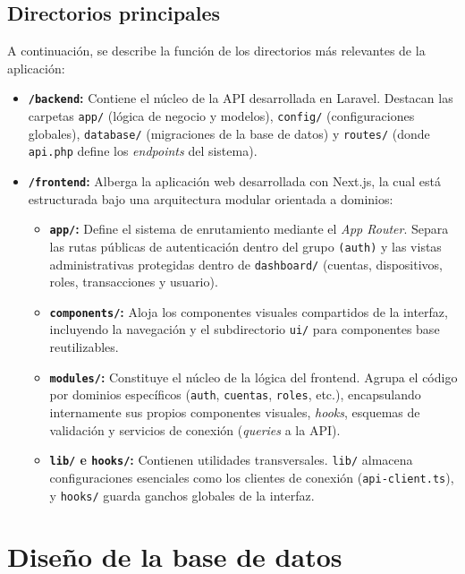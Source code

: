 \documentclass[12pt,letterpaper]{report}
\begin{document}
	\subsection{Directorios principales} 
	A continuación, se describe la función de los directorios más relevantes de la aplicación:
	
	\begin{itemize}
		\item \textbf{\texttt{/backend}:} Contiene el núcleo de la API desarrollada en Laravel. Destacan las carpetas \texttt{app/} (lógica de negocio y modelos), \texttt{config/} (configuraciones globales), \texttt{database/} (migraciones de la base de datos) y \texttt{routes/} (donde \texttt{api.php} define los \textit{endpoints} del sistema).
		
		\item \textbf{\texttt{/frontend}:} Alberga la aplicación web desarrollada con Next.js, la cual está estructurada bajo una arquitectura modular orientada a dominios:
		\begin{itemize}
			\item \textbf{\texttt{app/}:} Define el sistema de enrutamiento mediante el \textit{App Router}. Separa las rutas públicas de autenticación dentro del grupo \texttt{(auth)} y las vistas administrativas protegidas dentro de \texttt{dashboard/} (cuentas, dispositivos, roles, transacciones y usuario).
			\item \textbf{\texttt{components/}:} Aloja los componentes visuales compartidos de la interfaz, incluyendo la navegación y el subdirectorio \texttt{ui/} para componentes base reutilizables.
			\item \textbf{\texttt{modules/}:} Constituye el núcleo de la lógica del frontend. Agrupa el código por dominios específicos (\texttt{auth}, \texttt{cuentas}, \texttt{roles}, etc.), encapsulando internamente sus propios componentes visuales, \textit{hooks}, esquemas de validación y servicios de conexión (\textit{queries} a la API).
			\item \textbf{\texttt{lib/} e \textbf{\texttt{hooks/}}:} Contienen utilidades transversales. \texttt{lib/} almacena configuraciones esenciales como los clientes de conexión (\texttt{api-client.ts}), y \texttt{hooks/} guarda ganchos globales de la interfaz.
		\end{itemize}
	\end{itemize}
	\section{Diseño de la base de datos}
	
\end{document}
